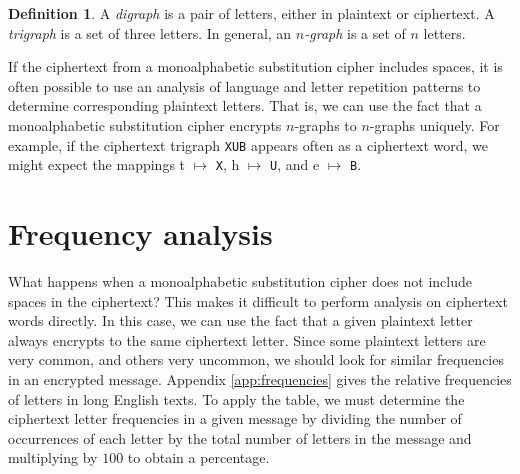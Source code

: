\documentclass{book}
\theoremstyle{plain}
\theoremstyle{definition}
\newtheorem{definition}[theorem]{Definition}
\newcommand{\ciphertext}[1]{\texttt{#1}} %
\begin{document}
\begin{definition}
A {\it digraph} is a pair of letters, either in plaintext or ciphertext. A {\it trigraph} is a set of three letters. In general, an {\it $n$-graph} is a set of $n$ letters.
\end{definition}

If the ciphertext from a monoalphabetic substitution cipher includes spaces, it is often possible to use an analysis of language and letter repetition patterns to determine corresponding plaintext letters. That is, we can use the fact that a monoalphabetic substitution cipher encrypts $n$-graphs to $n$-graphs uniquely. For example, if the ciphertext trigraph \ciphertext{XUB} appears often as a ciphertext word, we might expect the mappings t $\mapsto$ \ciphertext{X}, h $\mapsto$ \ciphertext{U}, and e $\mapsto$ \ciphertext{B}.

\section{Frequency analysis}
What happens when a monoalphabetic substitution cipher does not include spaces in the ciphertext? This makes it difficult to perform analysis on ciphertext words directly. In this case, we can use the fact that a given plaintext letter always encrypts to the same ciphertext letter. Since some plaintext letters are very common, and others very uncommon, we should look for similar frequencies in an encrypted message. Appendix \ref{app:frequencies} gives the relative frequencies of letters in long English texts. To apply the table, we must determine the ciphertext letter frequencies in a given message by dividing the number of occurrences of each letter by the total number of letters in the message and multiplying by $100$ to obtain a percentage.
\end{document}
